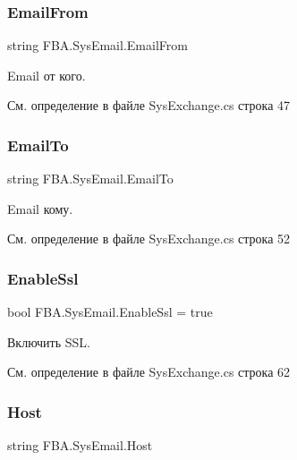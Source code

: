 \subsubsection{\texorpdfstring{Email\+From}{EmailFrom}}
{\footnotesize\ttfamily string F\+B\+A.\+Sys\+Email.\+Email\+From}



Email от кого. 



См. определение в файле Sys\+Exchange.\+cs строка 47

\mbox{\label{class_f_b_a_1_1_sys_email_aed2c49fcdc15ad4fa1d00ccafba59f94}} 
\subsubsection{\texorpdfstring{Email\+To}{EmailTo}}
{\footnotesize\ttfamily string F\+B\+A.\+Sys\+Email.\+Email\+To}



Email кому. 



См. определение в файле Sys\+Exchange.\+cs строка 52

\mbox{\label{class_f_b_a_1_1_sys_email_a7f701209c457ade0739b3356660be0a3}} 
\subsubsection{\texorpdfstring{Enable\+Ssl}{EnableSsl}}
{\footnotesize\ttfamily bool F\+B\+A.\+Sys\+Email.\+Enable\+Ssl = true}



Включить S\+SL. 



См. определение в файле Sys\+Exchange.\+cs строка 62

\mbox{\label{class_f_b_a_1_1_sys_email_ac0c362c82fb69187163633a611af03eb}} 
\subsubsection{\texorpdfstring{Host}{Host}}
{\footnotesize\ttfamily string F\+B\+A.\+Sys\+Email.\+Host}



